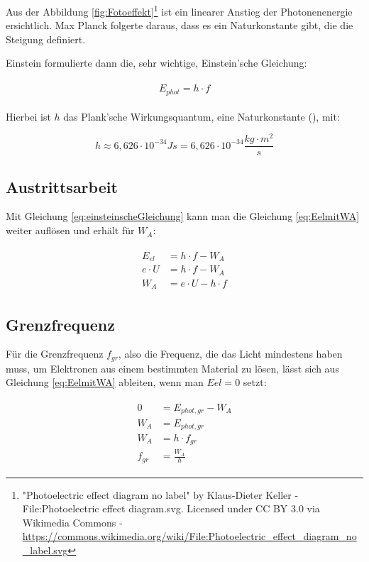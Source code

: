 Aus der Abbildung \ref{fig:Fotoeffekt}\footnote{"Photoelectric effect diagram no label" by Klaus-Dieter Keller - File:Photoelectric effect diagram.svg. Licensed under CC BY 3.0 via Wikimedia Commons - \url{https://commons.wikimedia.org/wiki/File:Photoelectric_effect_diagram_no_label.svg}} ist ein linearer Anstieg der Photonenenergie ersichtlich. Max Planck folgerte daraus, dass es ein Naturkonstante gibt, die die Steigung definiert.

Einstein formulierte dann die, sehr wichtige, Einstein'sche Gleichung:

\begin{align}	\label{eq:einsteinscheGleichung}
\begin{split}
	E_{phot} = h \cdot f
\end{split}
\end{align}

\noindent Hierbei ist $h$ das \glqq Plank'sche Wirkungsquantum\grqq , eine Naturkonstante (), mit:

\begin{equation}
	h \approx 6,626 \cdot 10^{-34} Js = 6,626 \cdot 10^{-34} \frac{kg \cdot m^2}{s}
\end{equation}


\subsection{Austrittsarbeit}

Mit Gleichung \ref{eq:einsteinscheGleichung} kann man die Gleichung \ref{eq:EelmitWA} weiter auflösen und erhält für $W_A$:

\begin{align} \label{eq:Austrittsarbeit}
\begin{split}
	E_{el} &= h \cdot f - W_A \\
	e \cdot U &= h \cdot f - W_A \\
	W_A &= e \cdot U - h \cdot f
\end{split}
\end{align}


\subsection{Grenzfrequenz}

Für die Grenzfrequenz $f_{gr}$, also die Frequenz, die das Licht mindestens haben muss, um Elektronen aus einem bestimmten Material zu lösen, lässt sich aus Gleichung \ref{eq:EelmitWA} ableiten, wenn man $E{el} = 0$ setzt:

\begin{align} \label{eq:Grenzfrequenz}
\begin{split}
	0 &= E_{phot,gr} - W_A \\
	W_A &= E_{phot,gr} \\
	W_A &= h \cdot f_{gr} \\
	f_{gr} &= \frac{W_A}{h}
\end{split}
\end{align}


